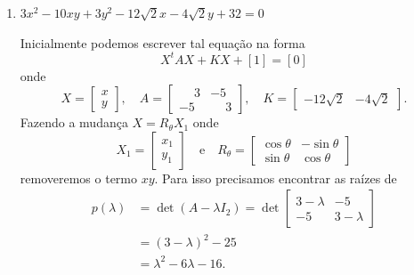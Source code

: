 \begin{exemplos}
\begin{enumerate}
        \item $3x^2 - 10xy + 3y^2 - 12\sqrt{2}x - 4\sqrt{2}y + 32 = 0$
              \begin{solucao}
                  Inicialmente podemos escrever tal equação na forma
                  \[
                      X^t A X + KX + [1] = [0]
                  \]
                  onde
                  \[
                      X = \begin{bmatrix}
                          x \\y
                      \end{bmatrix}, \quad A = \begin{bmatrix}
                          \phantom{-}3 & -5           \\
                          -5           & \phantom{-}3
                      \end{bmatrix},\quad K = \begin{bmatrix}
                          -12\sqrt{2} & -4\sqrt{2}
                      \end{bmatrix}.
                  \]
                  Fazendo a mudança $X = R_\theta X_1$ onde
                  \[
                      X_1 = \begin{bmatrix}
                          x_1 \\y_1
                      \end{bmatrix} \quad\mbox{e}\quad R_\theta = \begin{bmatrix}
                          \cos\theta & -\sin\theta \\
                          \sin\theta & \cos\theta
                      \end{bmatrix}
                  \]
                  removeremos o termo $xy$. Para isso precisamos encontrar as raízes de
                  \begin{align*}
                      p(\lambda) & = \det (A - \lambda I_2) = \det \begin{bmatrix}
                                                                       3 - \lambda & -5          \\
                                                                       -5          & 3 - \lambda
                                                                   \end{bmatrix} \\ &= (3 - \lambda)^2 - 25\\ &= \lambda^2 - 6\lambda - 16.
                  \end{align*}

\end{solucao}
\end{enumerate}
\end{exemplos}
